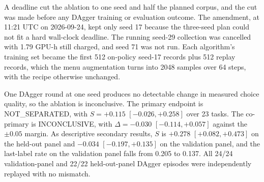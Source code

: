 A deadline cut the ablation to one seed and half the planned corpus, and the cut was made before any DAgger training or evaluation outcome. The amendment, at 11:21 UTC on 2026-09-24, kept only seed 17 because the three-seed plan could not fit a hard wall-clock deadline. The running seed-29 collection was cancelled with 1.79 GPU-h still charged, and seed 71 was not run. Each algorithm's training set became the first 512 on-policy seed-17 records plus 512 replay records, which the menu augmentation turns into 2048 samples over 64 steps, with the recipe otherwise unchanged.

One DAgger round at one seed produces no detectable change in measured choice quality, so the ablation is inconclusive. The primary endpoint is NOT\_SEPARATED, with $S = +0.115$ $[-0.026, +0.258]$ over 23 tasks. The co-primary is INCONCLUSIVE, with $\Delta = -0.030$ $[-0.114, +0.057]$ against the $\pm 0.05$ margin. As descriptive secondary results, $S$ is $+0.278$ $[+0.082, +0.473]$ on the held-out panel and $-0.034$ $[-0.197, +0.135]$ on the validation panel, and the last-label rate on the validation panel falls from 0.205 to 0.137. All 24/24 validation-panel and 22/22 held-out-panel DAgger episodes were independently replayed with no mismatch.

